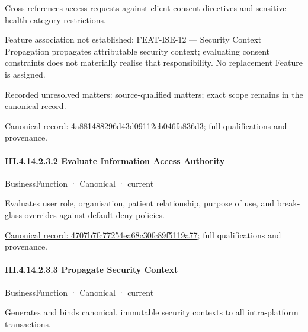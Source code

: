 Cross-references access requests against client consent directives and sensitive health category restrictions.



Feature association not established: FEAT-ISE-12 — Security Context Propagation propagates attributable security context; evaluating consent constraints does not materially realise that responsibility. No replacement Feature is assigned.


{\small Recorded unresolved matters: source-qualified matters; exact scope remains in the canonical record.}\par
{\footnotesize \href{../../../../../../../../continuum/business/business-function/4a881488296d43d09112cb046fa836d3.md}{Canonical record: 4a881488296d43d09112cb046fa836d3}; full qualifications and provenance.}\par
\paragraph*{III.4.14.2.3.2 Evaluate Information Access Authority}
\label{navigation:III.4.14.2.3.2}

\label{element:4707b7fc77254ea68c30fc89f5119a77}
{\small BusinessFunction · Canonical · current}\par

Evaluates user role, organisation, patient relationship, purpose of use, and break-glass overrides against default-deny policies.


{\footnotesize \href{../../../../../../../../continuum/business/business-function/4707b7fc77254ea68c30fc89f5119a77.md}{Canonical record: 4707b7fc77254ea68c30fc89f5119a77}; full qualifications and provenance.}\par
\paragraph*{III.4.14.2.3.3 Propagate Security Context}
\label{navigation:III.4.14.2.3.3}

\label{element:ee79679c6b5041659a2efca15190454f}
{\small BusinessFunction · Canonical · current}\par

Generates and binds canonical, immutable security contexts to all intra-platform transactions.



